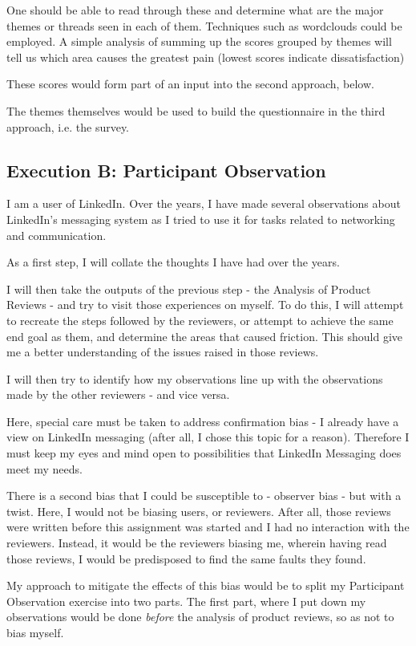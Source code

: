 \documentclass[
	letterpaper, %
]{jdf}
\begin{document}
One should be able to read through these and determine what are the major themes or threads seen in each of them. Techniques such as wordclouds could be employed. A simple analysis of summing up the scores grouped by themes will tell us which area causes the greatest pain (lowest scores indicate dissatisfaction)

These scores would form part of an input into the second approach, below.

The themes themselves would be used to build the questionnaire in the third approach, i.e. the survey.

\subsection{Execution B: Participant Observation}
I am a user of LinkedIn. Over the years, I have made several observations about LinkedIn's messaging system as I tried to use it for tasks related to networking and communication.

As a first step, I will collate the thoughts I have had over the years.

I will then take the outputs of the previous step - the Analysis of Product Reviews - and try to visit those experiences on myself. To do this, I will attempt to recreate the steps followed by the reviewers, or attempt to achieve the same end goal as them, and determine the areas that caused friction. This should give me a better understanding of the issues raised in those reviews.

I will then try to identify how my observations line up with the observations made by the other reviewers - and vice versa.

Here, special care must be taken to address confirmation bias - I already have a view on LinkedIn messaging (after all, I chose this topic for a reason). Therefore I must keep my eyes and mind open to possibilities that LinkedIn Messaging does meet my needs.

There is a second bias that I could be susceptible to - observer bias - but with a twist. Here, I would not be biasing users, or reviewers. After all, those reviews were written before this assignment was started and I had no interaction with the reviewers. Instead, it would be the reviewers biasing me, wherein having read those reviews, I would be predisposed to find the same faults they found.

My approach to mitigate the effects of this bias would be to split my Participant Observation exercise into two parts. The first part, where I put down my observations would be done \textit{before} the analysis of product reviews, so as not to bias myself.
\end{document}
